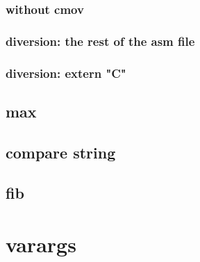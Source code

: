 



\subsubsection{without cmov}



\subsubsection{diversion: the rest of the asm file}


\subsubsection{diversion: extern "C"}



\subsection{max}







\subsection{compare string}





\subsection{fib}





\section{varargs}




